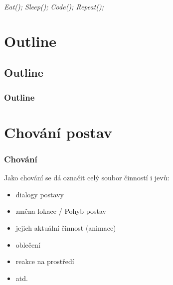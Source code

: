 ﻿\documentclass[a4paper]{beamer}
\author[\FirstNameAbbreviated. \LastName]{\FirstName{} \LastName}
\title{\DissertationTitle}
\date{\today}
\begin{document}
\begin{frame}
\titlepage
\centering \textit{Eat(); Sleep(); Code(); Repeat();}
\end{frame}

\section*{Outline}
\subsection*{Outline}
\begin{frame}[allowframebreaks]
\frametitle{Outline}
\tableofcontents
\end{frame}





\section{Chování postav}

\begin{frame}
\frametitle{Chování}

Jako chování se dá označit celý soubor činností i jevů:

 \begin{itemize}
     \item dialogy postavy
     \item změna lokace / Pohyb postav
     \item jejich aktuální činnost (animace)
     \item oblečení
     \item reakce na prostředí
     \item atd.
 \end{itemize}
\end{frame}
\end{document}
